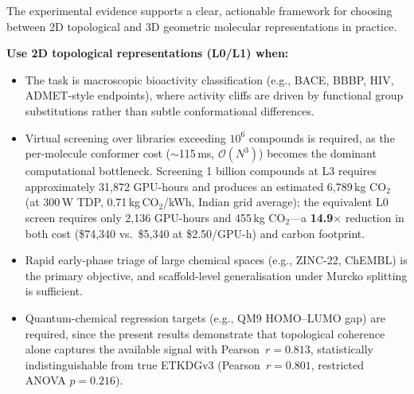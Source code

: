 \documentclass[pdflatex,sn-vancouver-num]{sn-jnl}%
\theoremstyle{thmstyleone}%
\theoremstyle{thmstyletwo}%
\theoremstyle{thmstylethree}%
\begin{document}
The experimental evidence supports a clear, actionable framework for choosing between 2D topological and 3D geometric molecular representations in practice.

\textbf{Use 2D topological representations (L0/L1) when:}
\begin{itemize}
  \item The task is macroscopic bioactivity classification (e.g., BACE, BBBP, HIV, ADMET-style endpoints), where activity cliffs are driven by functional group substitutions rather than subtle conformational differences.
  \item Virtual screening over libraries exceeding $10^6$ compounds is required, as the per-molecule conformer cost ($\sim$115\,ms, $\mathcal{O}(N^3)$) becomes the dominant computational bottleneck. Screening 1 billion compounds at L3 requires approximately 31,872 GPU-hours and produces an estimated 6,789\,kg CO$_2$ (at 300\,W TDP, 0.71\,kg\,CO$_2$/kWh, Indian grid average); the equivalent L0 screen requires only 2,136 GPU-hours and 455\,kg CO$_2$---a \textbf{14.9}$\times$ reduction in both cost (\$74,340 vs.\ \$5,340 at \$2.50/GPU-h) and carbon footprint.
  \item Rapid early-phase triage of large chemical spaces (e.g., ZINC-22, ChEMBL) is the primary objective, and scaffold-level generalisation under Murcko splitting is sufficient.
  \item Quantum-chemical regression targets (e.g., QM9 HOMO--LUMO gap) are required, since the present results demonstrate that topological coherence alone captures the available signal with Pearson~$r = 0.813$, statistically indistinguishable from true ETKDGv3 (Pearson~$r = 0.801$, restricted ANOVA $p = 0.216$).
\end{itemize}
\end{document}
